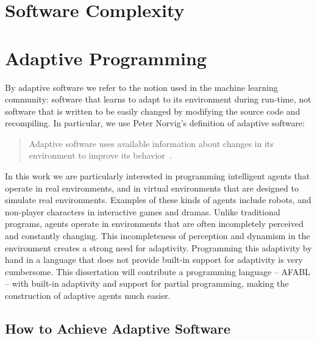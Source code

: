 

\section{Software Complexity}


\cite{mccabe1976complexity}


\cite{gill1991cyclomatic}


\cite{weyuker1988evaluating}


\cite{mccabe1989design}


\cite{kearney1986software}


\cite{shao2003new}



\section{Adaptive Programming}

By adaptive software we refer to the notion used in the machine learning community: software that learns to adapt to its environment during run-time, not software that is written to be easily changed by modifying the source code and recompiling.  In particular, we use Peter Norvig's definition of adaptive software:

\begin{quote}
Adaptive software uses available information about changes in its
environment to improve its behavior~\cite{norvig1998adaptive}.
\end{quote}

In this work we are particularly interested in programming intelligent agents that operate in real environments, and in virtual environments that are designed to simulate real environments.  Examples of these kinds of agents include robots, and non-player characters in interactive games and dramas.  Unlike traditional programs, agents operate in environments that are often incompletely perceived and constantly changing.  This incompleteness of perception and dynamism in the environment creates a strong need for adaptivity.  Programming this adaptivity by hand in a language that does not provide built-in support for adaptivity is very cumbersome.  This dissertation will contribute a programming language -- AFABL -- with built-in adaptivity and support for partial programming, making the construction of adaptive agents much easier.


\subsection{How to Achieve Adaptive Software}

